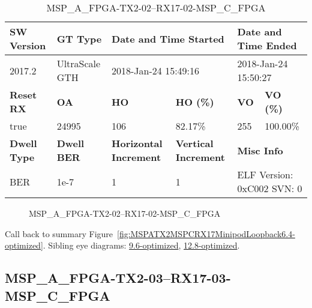 \begin{table}[h]
\centering
\caption{MSP\_A\_FPGA-TX2-02--RX17-02-MSP\_C\_FPGA}
\label{tab:MSPAFPGATX202RX1702MSPCFPGA6.4-optimized}
\begin{tabular}{@{}|l|l|l|l|l|l|@{}}
\toprule
\textbf{SW Version}                & \textbf{GT Type}   & \multicolumn{2}{l|}{\textbf{Date and Time Started}}            & \multicolumn{2}{l|}{\textbf{Date and Time Ended}}        \\ \midrule
2017.2                       & UltraScale GTH          & \multicolumn{2}{l|}{2018-Jan-24 15:49:16}                   & \multicolumn{2}{l|}{2018-Jan-24 15:50:27}               \\ \midrule
\textbf{Reset RX}                  & \textbf{OA} & \textbf{HO}   & \textbf{HO (\%)} & \textbf{VO} & \textbf{VO (\%)} \\ \midrule
true & 24995        & 106          & 82.17\%        & 255        & 100.00\%       \\ \midrule
\textbf{Dwell Type}                & \textbf{Dwell BER} & \textbf{Horizontal Increment} & \textbf{Vertical Increment}    & \multicolumn{2}{l|}{\textbf{Misc Info}}                  \\ \midrule
BER                            & 1e-7        & 1        & 1           & \multicolumn{2}{l|}{ELF Version: 0xC002 SVN: 0}                         \\ \bottomrule
\end{tabular}
\end{table}

\begin{figure}[h]
\caption{MSP\_A\_FPGA-TX2-02--RX17-02-MSP\_C\_FPGA} \label{fig:MSPAFPGATX202RX1702MSPCFPGA6.4-optimized}
\end{figure}

Call back to summary Figure~\ref{fig:MSPATX2MSPCRX17MinipodLoopback6.4-optimized}.
Sibling eye diagrams: \hyperref[sec:MSPAFPGATX202RX1702MSPCFPGA9.6-optimized]{9.6-optimized}, \hyperref[sec:MSPAFPGATX202RX1702MSPCFPGA12.8-optimized]{12.8-optimized}.

\clearpage
\newpage


\subsection{MSP\_A\_FPGA-TX2-03--RX17-03-MSP\_C\_FPGA}\label{sec:MSPAFPGATX203RX1703MSPCFPGA6.4-optimized}

